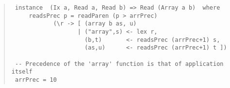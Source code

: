 \begin{quote}
{\begin{verbatim}
 instance  (Ix a, Read a, Read b) => Read (Array a b)  where
     readsPrec p = readParen (p > arrPrec)
            (\r -> [ (array b as, u) 
                   | ("array",s) <- lex r,
                     (b,t)       <- readsPrec (arrPrec+1) s,
                     (as,u)      <- readsPrec (arrPrec+1) t ])
 
 -- Precedence of the 'array' function is that of application itself
 arrPrec = 10
\end{verbatim}}
\end{quote}

